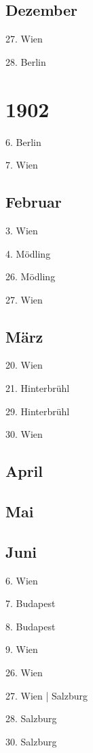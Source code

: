 \documentclass[twoside=false,titlepage=false,open=any, parskip=never, fontsize=10pt, headings=small, chapterprefix=false, appendixprefix=false, DIV=15]{scrbook}
\begin{document}
\begin{multicols}{3}
            \section*{Dezember}
            27. Wien\par
            28. Berlin\par
            \chapter*{1902}
            6. Berlin\par
            7. Wien\par
            \section*{Februar}
            3. Wien\par
            4. Mödling\par
            26. Mödling\par
            27. Wien\par
            \section*{März}
            20. Wien\par
            21. Hinterbrühl\par
            29. Hinterbrühl\par
            30. Wien\par
            \section*{April}
            \section*{Mai}
            \section*{Juni}
            6. Wien\par
            7. Budapest\par
            8. Budapest\par
            9. Wien\par
            26. Wien\par
            27. Wien | Salzburg\par
            28. Salzburg\par
            30. Salzburg\par

\end{multicols}
\end{document}
